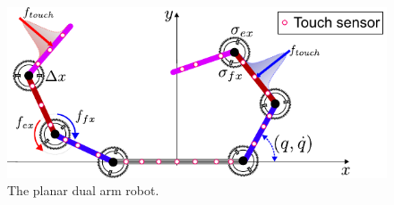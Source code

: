 \begin{figure}[!t]
	\begin{center}
		\hspace*{\fill}
		\includegraphics[width=0.99\columnwidth]{extended_dual_arm_robot.pdf}
		\hspace*{\fill}
	\end{center}
	\caption{\label{fig:extended_dual_arm_robot} The planar dual arm robot.}
\end{figure}



